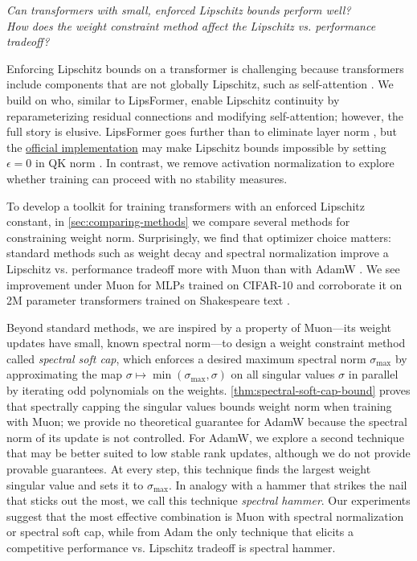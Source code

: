 \begin{center}
    \textit{Can transformers with small, enforced Lipschitz bounds perform well?\\
    How does the weight constraint method affect the Lipschitz vs. performance tradeoff?}
\end{center}

Enforcing Lipschitz bounds on a transformer is challenging because transformers include components that are not globally Lipschitz, such as self-attention \citep{kim2021lipschitzconstantselfattention}. We build on \citet{large2024} who, similar to LipsFormer, enable Lipschitz continuity by reparameterizing residual connections and modifying self-attention; however, the full story is elusive. LipsFormer goes further than \citet{large2024} to eliminate layer norm \citep{ba2016layernormalization}, but the \href{https://github.com/IDEA-Research/LipsFormer/blob/main/models/lipsformer_swin.py#L205-L206}{official implementation} may make Lipschitz bounds impossible by setting $\epsilon = 0$ in QK norm \citep{henry2020querykeynormalizationtransformers}. In contrast, we remove activation normalization to explore whether training can proceed with no stability measures.

To develop a toolkit for training transformers with an enforced Lipschitz constant, in \cref{sec:comparing-methods} we compare several methods for constraining weight norm. Surprisingly, we find that optimizer choice matters: standard methods such as weight decay \citep{krogh1991simple} and spectral normalization \citep{yoshida2017spectralnormregularizationimproving} improve a Lipschitz vs. performance tradeoff more with Muon \citep{jordan2024muon} than with AdamW \citep{loshchilov2019adamw}. We see improvement under Muon for MLPs trained on CIFAR-10 \citep{krizhevsky2009cifar} and corroborate it on 2M parameter transformers trained on Shakespeare text \citep{karpathy_nanoGPT}.

Beyond standard methods, we are inspired by a property of Muon---its weight updates have small, known spectral norm---to design a weight constraint method called \textit{spectral soft cap}, which enforces a desired maximum spectral norm $\sigma_\text{max}$ by approximating the map $\sigma \mapsto \min(\sigma_\text{max}, \sigma)$ on all singular values $\sigma$ in parallel by iterating odd polynomials on the weights. \cref{thm:spectral-soft-cap-bound} proves that spectrally capping the singular values bounds weight norm when training with Muon; we provide no theoretical guarantee for AdamW because the spectral norm of its update is not controlled. For AdamW, we explore a second technique that may be better suited to low stable rank updates, although we do not provide provable guarantees. At every step, this technique finds the largest weight singular value and sets it to $\sigma_\text{max}$. In analogy with a hammer that strikes the nail that sticks out the most, we call this technique \textit{spectral hammer}. Our experiments suggest that the most effective combination is Muon with spectral normalization or spectral soft cap, while from Adam the only technique that elicits a competitive performance vs. Lipschitz tradeoff is spectral hammer.

